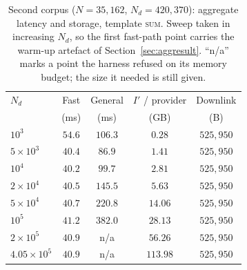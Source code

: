 \documentclass[a4paper,fleqn]{cas-dc}
\begin{document}
\begin{table}[pos=t]
\caption{Second corpus ($N=35{,}162$, $N_d=420{,}370$): aggregate latency and
storage, template \textsc{sum}. Sweep taken in increasing $N_d$, so the first
fast-path point carries the warm-up artefact of
Section~\ref{sec:aggresult}. ``n/a'' marks a point the harness refused on its
memory budget; the size it needed is still given.}
\label{tab:beijing}
\centering
\footnotesize
\setlength{\tabcolsep}{3pt}
\renewcommand{\arraystretch}{1.2}
\begin{tabular*}{\tblwidth}{@{\extracolsep{\fill}}lcccc@{}}
\toprule
$N_d$ & Fast & General & $I'$ / provider & Downlink \\
      & (ms) & (ms)     & (GB)            & (B) \\
\midrule
$10^3$             & $54.6$ & $106.3$ & $0.28$   & $525{,}950$ \\
$5\times10^3$      & $40.4$ & $86.9$  & $1.41$   & $525{,}950$ \\
$10^4$             & $40.2$ & $99.7$  & $2.81$   & $525{,}950$ \\
$2\times10^4$      & $40.5$ & $145.5$ & $5.63$   & $525{,}950$ \\
$5\times10^4$      & $40.7$ & $220.8$ & $14.06$  & $525{,}950$ \\
$10^5$             & $41.2$ & $382.0$ & $28.13$  & $525{,}950$ \\
$2\times10^5$      & $40.9$ & n/a     & $56.26$  & $525{,}950$ \\
$4.05\times10^5$   & $40.9$ & n/a     & $113.98$ & $525{,}950$ \\
\bottomrule
\end{tabular*}
\end{table}
\end{document}
